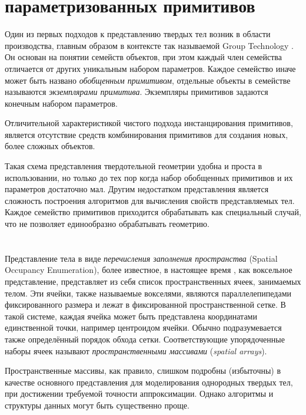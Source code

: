 \section{ параметризованных примитивов} \label{sect_primitive_instatiation}

Один из первых подходов к представлению твердых тел возник в области производства, главным образом в контексте так называемой Group Technology \cite{Gall73}. Он основан на понятии семейств объектов, при этом каждый член семейства отличается от других уникальным набором параметров. Каждое семейство иначе может быть названо \textit{обобщенным примитивом}, отдельные объекты в семействе называются \textit{экземплярами примитива}. Экземпляры примитивов задаются конечным набором параметров.

Отличительной характеристикой чистого подхода инстанцирования примитивов, является отсутствие средств комбинирования примитивов для создания новых, более сложных объектов.

Такая схема представления твердотельной геометрии удобна и проста в использовании, но только до тех пор когда набор обобщенных примитивов и их параметров достаточно мал. Другим недостатком представления является сложность построения алгоритмов для вычисления свойств представляемых тел. Каждое семейство примитивов приходится обрабатывать как специальный случай, что не позволяет единообразно обрабатывать геометрию.

\section{} \label{sect_spatial_occupancy_enum}

Представление тела в виде \textit{перечисления заполнения пространства} (Spatial Occupancy Enumeration), более известное, в настоящее время , как воксельное представление, представляет из себя список пространственных ячеек, занимаемых телом. Эти ячейки, также называемые вокселями, являются параллелепипедами фиксированного размера и лежат в фиксированной пространственной сетке. В такой системе, каждая ячейка может быть представлена координатами единственной точки, например центроидом ячейки. Обычно подразумевается также определённый порядок обхода сетки. Соответствующие упорядоченные наборы ячеек называют \textit{пространственными массивами} (\textit{spatial arrays}).

Пространственные массивы, как правило, слишком подробны (избыточны) в качестве основного представления для моделирования однородных твердых тел, при достижении требуемой точности аппроксимации. Однако алгоритмы и структуры данных могут быть существенно проще.

